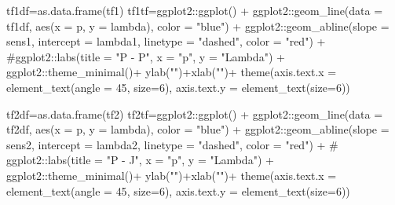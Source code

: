 \documentclass[
  12pt,
  letterpaper,
]{book}
\newenvironment{Shaded}{\begin{snugshade}}{\end{snugshade}}
\newcommand{\AttributeTok}[1]{\textcolor[rgb]{0.40,0.45,0.13}{#1}}
\newcommand{\CommentTok}[1]{\textcolor[rgb]{0.37,0.37,0.37}{#1}}
\newcommand{\DecValTok}[1]{\textcolor[rgb]{0.68,0.00,0.00}{#1}}
\newcommand{\FunctionTok}[1]{\textcolor[rgb]{0.28,0.35,0.67}{#1}}
\newcommand{\NormalTok}[1]{\textcolor[rgb]{0.00,0.23,0.31}{#1}}
\newcommand{\OtherTok}[1]{\textcolor[rgb]{0.00,0.23,0.31}{#1}}
\newcommand{\SpecialCharTok}[1]{\textcolor[rgb]{0.37,0.37,0.37}{#1}}
\newcommand{\StringTok}[1]{\textcolor[rgb]{0.13,0.47,0.30}{#1}}
\begin{document}
\begin{Shaded}
\begin{Highlighting}[]
\NormalTok{tf1df}\OtherTok{=}\FunctionTok{as.data.frame}\NormalTok{(tf1)}
\NormalTok{tf1tf}\OtherTok{=}\NormalTok{ggplot2}\SpecialCharTok{::}\FunctionTok{ggplot}\NormalTok{() }\SpecialCharTok{+}
\NormalTok{  ggplot2}\SpecialCharTok{::}\FunctionTok{geom\_line}\NormalTok{(}\AttributeTok{data =}\NormalTok{ tf1df, }\FunctionTok{aes}\NormalTok{(}\AttributeTok{x =}\NormalTok{ p, }\AttributeTok{y =}\NormalTok{ lambda), }\AttributeTok{color =} \StringTok{"blue"}\NormalTok{) }\SpecialCharTok{+}
\NormalTok{  ggplot2}\SpecialCharTok{::}\FunctionTok{geom\_abline}\NormalTok{(}\AttributeTok{slope =}\NormalTok{ sens1, }\AttributeTok{intercept =}\NormalTok{ lambda1, }\AttributeTok{linetype =} \StringTok{"dashed"}\NormalTok{, }\AttributeTok{color =} \StringTok{"red"}\NormalTok{) }\SpecialCharTok{+}
  \CommentTok{\#ggplot2::labs(title = "P {-} P", x = "p", y = "Lambda") +}
\NormalTok{  ggplot2}\SpecialCharTok{::}\FunctionTok{theme\_minimal}\NormalTok{()}\SpecialCharTok{+}
  \FunctionTok{ylab}\NormalTok{(}\StringTok{""}\NormalTok{)}\SpecialCharTok{+}\FunctionTok{xlab}\NormalTok{(}\StringTok{""}\NormalTok{)}\SpecialCharTok{+}
  \FunctionTok{theme}\NormalTok{(}\AttributeTok{axis.text.x =} \FunctionTok{element\_text}\NormalTok{(}\AttributeTok{angle =} \DecValTok{45}\NormalTok{, }\AttributeTok{size=}\DecValTok{6}\NormalTok{),}
        \AttributeTok{axis.text.y =} \FunctionTok{element\_text}\NormalTok{(}\AttributeTok{size=}\DecValTok{6}\NormalTok{))}
  


\NormalTok{tf2df}\OtherTok{=}\FunctionTok{as.data.frame}\NormalTok{(tf2)}
\NormalTok{tf2tf}\OtherTok{=}\NormalTok{ggplot2}\SpecialCharTok{::}\FunctionTok{ggplot}\NormalTok{() }\SpecialCharTok{+}
\NormalTok{  ggplot2}\SpecialCharTok{::}\FunctionTok{geom\_line}\NormalTok{(}\AttributeTok{data =}\NormalTok{ tf2df, }\FunctionTok{aes}\NormalTok{(}\AttributeTok{x =}\NormalTok{ p, }\AttributeTok{y =}\NormalTok{ lambda), }\AttributeTok{color =} \StringTok{"blue"}\NormalTok{) }\SpecialCharTok{+}
\NormalTok{  ggplot2}\SpecialCharTok{::}\FunctionTok{geom\_abline}\NormalTok{(}\AttributeTok{slope =}\NormalTok{ sens2, }\AttributeTok{intercept =}\NormalTok{ lambda2, }\AttributeTok{linetype =} \StringTok{"dashed"}\NormalTok{, }\AttributeTok{color =} \StringTok{"red"}\NormalTok{) }\SpecialCharTok{+}
 \CommentTok{\# ggplot2::labs(title = "P {-} J", x = "p", y = "Lambda") +}
\NormalTok{  ggplot2}\SpecialCharTok{::}\FunctionTok{theme\_minimal}\NormalTok{()}\SpecialCharTok{+}
  \FunctionTok{ylab}\NormalTok{(}\StringTok{""}\NormalTok{)}\SpecialCharTok{+}\FunctionTok{xlab}\NormalTok{(}\StringTok{""}\NormalTok{)}\SpecialCharTok{+}
  \FunctionTok{theme}\NormalTok{(}\AttributeTok{axis.text.x =} \FunctionTok{element\_text}\NormalTok{(}\AttributeTok{angle =} \DecValTok{45}\NormalTok{, }\AttributeTok{size=}\DecValTok{6}\NormalTok{),}
        \AttributeTok{axis.text.y =} \FunctionTok{element\_text}\NormalTok{(}\AttributeTok{size=}\DecValTok{6}\NormalTok{))}


\end{Highlighting}
\end{Shaded}
\end{document}
